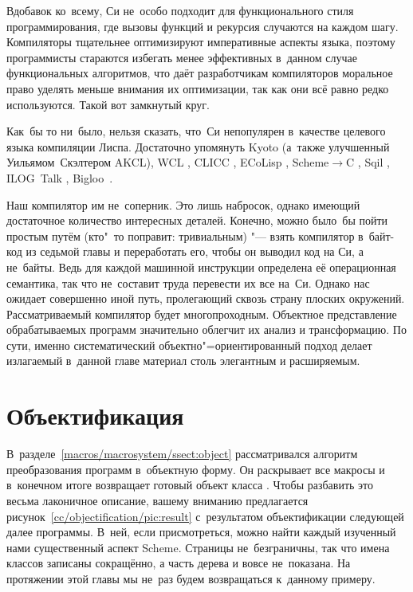 Вдобавок ко~всему, Си не~особо подходит для функционального стиля
программирования, где вызовы функций и рекурсия случаются на каждом шагу.
Компиляторы тщательнее оптимизируют императивные аспекты языка, поэтому
программисты стараются избегать менее эффективных в~данном случае функциональных
алгоритмов, что даёт разработчикам компиляторов моральное право уделять меньше
внимания их оптимизации, так как они всё равно редко используются. Такой вот
замкнутый круг.

Как~бы то ни~было, нельзя сказать, что~Си непопулярен в~качестве целевого языка
компиляции Лиспа. Достаточно упомянуть Kyoto {\CommonLisp} \cite{yh85} (а~также
улучшенный Уильямом~Скэлтером AKCL), WCL \cite{hen92b}, CLICC \cite{hof93},
ECoLisp \cite{att95}, Scheme$\to$C \cite{bar89}, Sqil \cite{sen91}, ILOG~Talk
\cite{ilo94}, Bigloo~\cite{ser94}.

Наш компилятор им не~соперник. Это лишь набросок, однако имеющий достаточное
количество интересных деталей. Конечно, можно было~бы пойти простым путём
(кто"~то поправит: тривиальным) "--- взять компилятор в~байт-код из седьмой
главы  и переработать его, чтобы он выводил код на
Си, а не~байты. Ведь для каждой машинной инструкции определена её операционная
семантика, так что не~составит труда перевести их все на~Си. Однако нас ожидает
совершенно иной путь, пролегающий сквозь страну плоских окружений.
 Рассматриваемый компилятор будет
многопроходным. Объектное представление обрабатываемых программ значительно
облегчит их анализ и трансформацию. По сути, именно систематический
объектно"=ориентированный подход делает излагаемый в~данной главе материал столь
элегантным и расширяемым.


\section{Объектификация}\label{cc/sect:objectification}

В~разделе~\ref{macros/macrosystem/ssect:object}
 рассматривался алгоритм преобразования
программ в~объектную форму. Он раскрывает все макросы и в~конечном итоге
возвращает готовый объект класса . Чтобы разбавить это весьма
лаконичное описание, вашему вниманию предлагается
рисунок~\ref{cc/objectification/pic:result} с~результатом объектификации
следующей далее программы. В~ней, если присмотреться, можно найти каждый
изученный нами существенный аспект Scheme. Страницы не~безграничны, так что
имена классов записаны сокращённо, а часть дерева и вовсе не~показана. На
протяжении этой главы мы не~раз будем возвращаться к~данному примеру.

